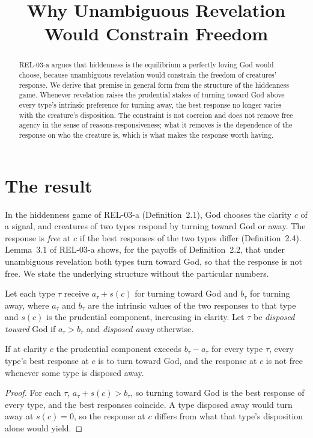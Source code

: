\documentclass{situationist-preprint}
\title{Why Unambiguous Revelation Would Constrain Freedom}
\begin{document}
\maketitle

\begin{abstract}
REL-03-a argues that hiddenness is the equilibrium a perfectly loving God would choose, because unambiguous revelation would constrain the freedom of creatures' response. We derive that premise in general form from the structure of the hiddenness game. Whenever revelation raises the prudential stakes of turning toward God above every type's intrinsic preference for turning away, the best response no longer varies with the creature's disposition. The constraint is not coercion and does not remove free agency in the sense of reasons-responsiveness; what it removes is the dependence of the response on who the creature is, which is what makes the response worth having.
\end{abstract}

\section{The result}

In the hiddenness game of REL-03-a (Definition~2.1), God chooses the clarity $c$ of a signal, and creatures of two types respond by turning toward God or away. The response is \emph{free} at $c$ if the best responses of the two types differ (Definition~2.4). Lemma~3.1 of REL-03-a shows, for the payoffs of Definition~2.2, that under unambiguous revelation both types turn toward God, so that the response is not free. We state the underlying structure without the particular numbers.

Let each type $\tau$ receive $a_\tau + s(c)$ for turning toward God and $b_\tau$ for turning away, where $a_\tau$ and $b_\tau$ are the intrinsic values of the two responses to that type and $s(c)$ is the prudential component, increasing in clarity. Let $\tau$ be \emph{disposed toward} God if $a_\tau > b_\tau$ and \emph{disposed away} otherwise.

\begin{proposition}\label{p:pool}
If at clarity $c$ the prudential component exceeds $b_\tau - a_\tau$ for every type $\tau$, every type's best response at $c$ is to turn toward God, and the response at $c$ is not free whenever some type is disposed away.
\end{proposition}

\begin{proof}
For each $\tau$, $a_\tau + s(c) > b_\tau$, so turning toward God is the best response of every type, and the best responses coincide. A type disposed away would turn away at $s(c) = 0$, so the response at $c$ differs from what that type's disposition alone would yield.
\end{proof}
\end{document}
